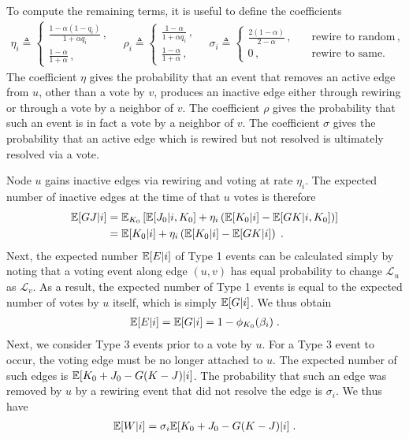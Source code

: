 \documentclass[review, onefignum, onetabnum]{siamart171218}
\begin{document}
        To compute the remaining terms, it is useful to define the coefficients 
        \begin{align}
        \eta_i \triangleq 
        \begin{cases}
          \frac{1-\alpha(1-q_i)}{1+\alpha q_i}\,,  \\ 
          \frac{1-\alpha}{1+\alpha}\,,
        \end{cases} \quad 
        \rho_i \triangleq 
        \begin{cases}
          \frac{1-\alpha}{1+\alpha q_i}\,,  \\ 
          \frac{1-\alpha}{1+\alpha}\,,   
        \end{cases} \quad 
        \sigma_i \triangleq 
        \begin{cases}
          \frac{2(1-\alpha)}{2-\alpha}\,, &\quad \text{rewire to random}\,, \\ 
          0\,,   &\quad \text{rewire to same.}
        \end{cases} \label{eq:coefs}
        \end{align}
        The coefficient $\eta$ gives the probability that an event that removes an active edge from $u$, other than a vote by $v$, produces an inactive edge either through rewiring or through a vote by a neighbor of $v$. The coefficient $\rho$ gives the probability that such an event is in fact a vote by a neighbor of $v$. The coefficient $\sigma$ gives the probability that an active edge which is rewired but not resolved is ultimately resolved via a vote. 
        
        Node $u$ gains inactive edges via rewiring and voting at rate $\eta_i$. 
        The expected number of inactive edges at the time of that $u$ votes is therefore 
        \begin{align*}
        \mathbb{E}[GJ|i] &= \mathbb{E}_{K_0}\left[\mathbb{E}[J_0|i, K_0] + \eta_i \left(\mathbb{E}[K_0|i] - \mathbb{E}[GK|i, K_0]\right)\right] \\
                    &= \mathbb{E}[K_0|i] + \eta_i \left(\mathbb{E}[K_0|i] - \mathbb{E}[GK|i]\right)\;.
        \end{align*}
        Next, the expected number $\mathbb{E}[E|i]$ of Type 1 events  can be calculated simply by noting that a voting event along edge $(u,v)$ has equal probability to change $\mathcal{L}_u$ as $\mathcal{L}_v$. 
        As a result, the expected number of Type 1 events is equal to the expected number of votes by $u$ itself, which is simply $\mathbb{E}[G|i]$. We thus obtain 
        \begin{align*}
        \mathbb{E}[E|i] = \mathbb{E}[G|i] = 1 - \phi_{K_0}(\beta_i)\;. 
        \end{align*}
        Next, we consider Type 3 events prior to a vote by $u$. 
        For a Type 3 event to occur, the voting edge must be no longer attached to $u$. 
        The expected number of such edges is $\mathbb{E}[K_0 + J_0 - G(K - J)|i]$. 
        The probability that such an edge was removed by $u$ by a rewiring event that did not resolve the edge is $\sigma_i$. 
        We thus have 
        \begin{align*}
            \mathbb{E}[W|i] = \sigma_i\mathbb{E}[K_0 + J_0 - G(K - J)|i]\;.
        \end{align*}
        
\end{document}
